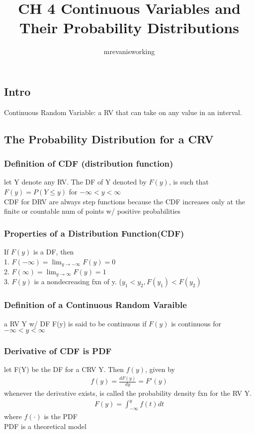 \documentclass[12pt]{article}
\begin{document}
\title{CH 4 Continuous Variables and Their Probability Distributions}
\author{mrevanisworking}
\maketitle

\subsection{Intro}
    Continuous Random Variable: a RV that can take on any value in an
    interval.
\subsection{The Probability Distribution for a CRV}
    \subsubsection{Definition of CDF (distribution function)}
        let Y denote any RV. The DF of Y denoted by $ F(y) $, is such that
        $ F(y) = P(Y\le y) $ for $ -\infty < y < \infty $\\
        CDF for DRV are always step functions because the CDF increases
        only at the finite or countable num of points w/ positive probabilities
    \subsubsection{Properties of a Distribution Function(CDF)}
        If $ F(y) $ is a DF, then\\
        1. $ F(-\infty ) = \lim_{y\to -\infty } F(y) = 0$\\
        2. $ F( \infty  )= \lim_{y\to \infty }F(y) = 1 $\\
        3. $ F(y) $ is a nondecreasing fxn of y. ($ y_{1} < y_{2}
        ,F(y_{1}) < F(y_{2}) $
    \subsubsection{Definition of a Continuous Random Varaible}
        a RV Y w/ DF F(y) is said to be continuous if $ F(y) $ is continuous
        for $ -\infty < y < \infty $
    \subsubsection{Derivative of CDF is PDF}
        let F(Y) be the DF for a CRV Y. Then $ f(y) $, given by
        \begin{align*}
            f(y) = \frac{dF(y)}{dy} = F'(y)
        \end{align*}
        whenever the derivative exists, is called the probability density
        fxn for the RV Y.
        \begin{align*}
            F(y) = \int_{-\infty }^{y}f(t)dt
        \end{align*}
        where $ f(\cdot) $ is the PDF\\
        PDF is a theoretical model 
\end{document}
